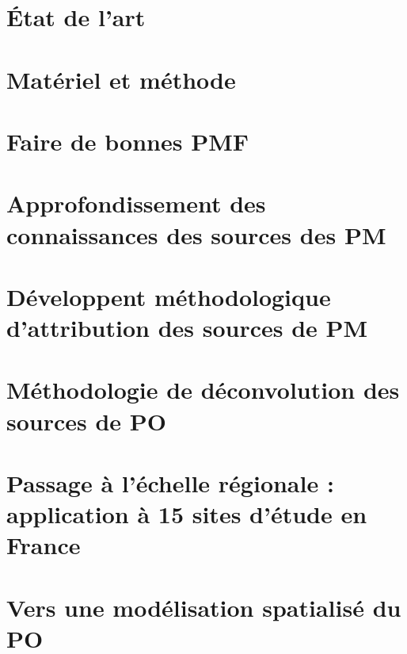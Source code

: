 \documentclass[a4paper,12pt]{book}
\begin{document}
\chapter{État de l'art}
\label{cha:etat_de_lart}
\PartialToc
\clearpage


\chapter{Matériel et méthode}
\label{cha:materiel_et_methode}
\PartialToc
\clearpage


\chapter{Faire de bonnes PMF}
\label{cha:bonnes_PMF}
\PartialToc
\clearpage


\chapter{Approfondissement des connaissances des sources des PM}%
\label{cha:approfondissement_des_connaissances_des_sources_des_pm}
\PartialToc
\clearpage
% 


\chapter{Développent méthodologique d'attribution des sources de PM}
\label{cha:developpement_methodologique_dattribution_des_sources_de_PM}
\PartialToc
\clearpage
% 

\chapter{Méthodologie de déconvolution des sources de PO}
\label{cha:methodology_for_the_attribution_of_intrisinc_op_to_a_pm_source}
\PartialToc
\clearpage
% 

\chapter{Passage à l'échelle régionale : application à 15 sites d'étude en France}
\label{cha:application_to_15_sites_in_France}
\PartialToc
\clearpage
% 

\chapter{Vers une modélisation spatialisé du PO}
\label{cha:spatio_temporal_modelizing}
\PartialToc
\clearpage
% 
\end{document}
